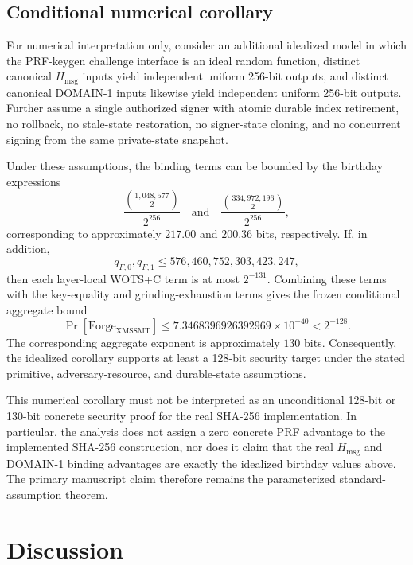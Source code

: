 \documentclass[pdflatex,sn-mathphys-num]{sn-jnl}
\begin{document}
\subsection{Conditional numerical corollary}
\label{subsec:wotsc_conditional_corollary}

For numerical interpretation only, consider an additional idealized model in
which the PRF-keygen challenge interface is an ideal random function,
distinct canonical $H_{\mathrm{msg}}$ inputs yield independent uniform
256-bit outputs, and distinct canonical DOMAIN-1 inputs likewise yield
independent uniform 256-bit outputs. Further assume a single authorized
signer with atomic durable index retirement, no rollback, no stale-state
restoration, no signer-state cloning, and no concurrent signing from the same
private-state snapshot.

Under these assumptions, the binding terms can be bounded by the birthday
expressions
\[
  \frac{\binom{1{,}048{,}577}{2}}{2^{256}}
  \quad\text{and}\quad
  \frac{\binom{334{,}972{,}196}{2}}{2^{256}},
\]
corresponding to approximately $217.00$ and $200.36$ bits, respectively.
If, in addition,
\[
 q_{F,0},q_{F,1}
 \le
 576{,}460{,}752{,}303{,}423{,}247,
\]
then each layer-local WOTS+C term is at most $2^{-131}$. Combining these
terms with the key-equality and grinding-exhaustion terms gives the frozen
conditional aggregate bound
\[
  \Pr[\mathrm{Forge}_{\mathrm{XMSSMT}}]
  \le
  7.3468396926392969\times 10^{-40}
  < 2^{-128}.
\]
The corresponding aggregate exponent is approximately $130$ bits.
Consequently, the idealized corollary supports at least a 128-bit security
target under the stated primitive, adversary-resource, and durable-state
assumptions.

This numerical corollary must not be interpreted as an unconditional
128-bit or 130-bit concrete security proof for the real SHA-256
implementation. In particular, the analysis does not assign a zero concrete
PRF advantage to the implemented SHA-256 construction, nor does it claim
that the real $H_{\mathrm{msg}}$ and DOMAIN-1 binding advantages are exactly
the idealized birthday values above. The primary manuscript claim therefore
remains the parameterized standard-assumption theorem.


\section{Discussion}
\end{document}
